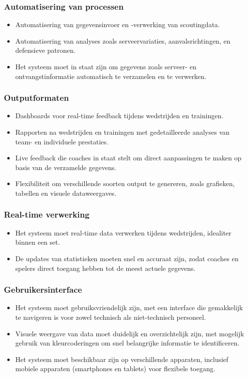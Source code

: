 \subsubsection{Automatisering van processen}
\begin{itemize}
  \item Automatisering van gegevensinvoer en -verwerking van scoutingdata.
  \item Automatisering van analyses zoals serveervariaties, aanvalsrichtingen, en defensieve patronen.
  \item Het systeem moet in staat zijn om gegevens zoals serveer- en ontvangstinformatie automatisch te verzamelen en te verwerken.
\end{itemize}

\subsubsection{Outputformaten}
\begin{itemize}
  \item Dashboards voor real-time feedback tijdens wedstrijden en trainingen.
  \item Rapporten na wedstrijden en trainingen met gedetailleerde analyses van team- en individuele prestaties.
  \item Live feedback die coaches in staat stelt om direct aanpassingen te maken op basis van de verzamelde gegevens.
  \item Flexibiliteit om verschillende soorten output te genereren, zoals grafieken, tabellen en visuele dataweergaves.
\end{itemize}

\subsubsection{Real-time verwerking}
\begin{itemize}
  \item Het systeem moet real-time data verwerken tijdens wedstrijden, idealiter binnen een set.
  \item De updates van statistieken moeten snel en accuraat zijn, zodat coaches en spelers direct toegang hebben tot de meest actuele gegevens.
\end{itemize}

\subsubsection{Gebruikersinterface}
\begin{itemize}
  \item Het systeem moet gebruiksvriendelijk zijn, met een interface die gemakkelijk te navigeren is voor zowel technisch als niet-technisch personeel.
  \item Visuele weergave van data moet duidelijk en overzichtelijk zijn, met mogelijk gebruik van kleurcoderingen om snel belangrijke informatie te identificeren.
  \item Het systeem moet beschikbaar zijn op verschillende apparaten, inclusief mobiele apparaten (smartphones en tablets) voor flexibele toegang.
\end{itemize}

